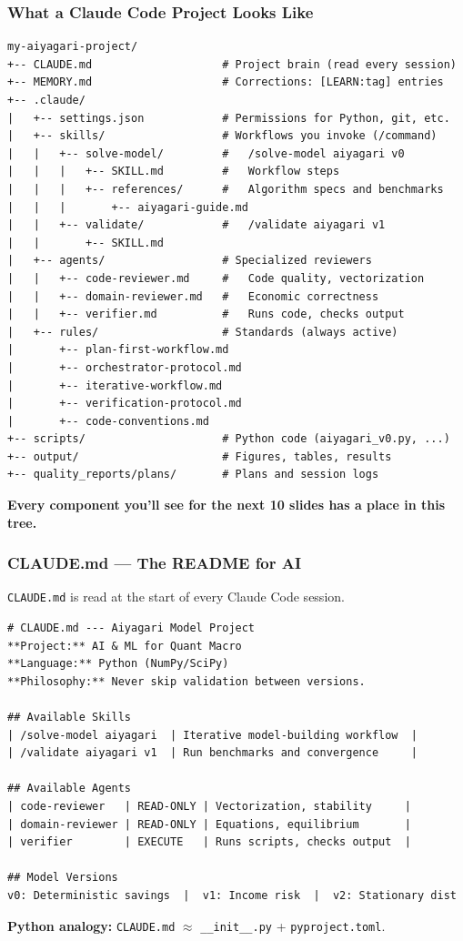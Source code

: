 \documentclass[10pt,english,aspectratio=169]{beamer}
\begin{document}
\begin{frame}[fragile]
\frametitle{What a Claude Code Project Looks Like}

\begin{lstlisting}[style=pythonstyle,language={},basicstyle=\ttfamily\tiny]
my-aiyagari-project/
+-- CLAUDE.md                    # Project brain (read every session)
+-- MEMORY.md                    # Corrections: [LEARN:tag] entries
+-- .claude/
|   +-- settings.json            # Permissions for Python, git, etc.
|   +-- skills/                  # Workflows you invoke (/command)
|   |   +-- solve-model/         #   /solve-model aiyagari v0
|   |   |   +-- SKILL.md         #   Workflow steps
|   |   |   +-- references/      #   Algorithm specs and benchmarks
|   |   |       +-- aiyagari-guide.md
|   |   +-- validate/            #   /validate aiyagari v1
|   |       +-- SKILL.md
|   +-- agents/                  # Specialized reviewers
|   |   +-- code-reviewer.md     #   Code quality, vectorization
|   |   +-- domain-reviewer.md   #   Economic correctness
|   |   +-- verifier.md          #   Runs code, checks output
|   +-- rules/                   # Standards (always active)
|       +-- plan-first-workflow.md
|       +-- orchestrator-protocol.md
|       +-- iterative-workflow.md
|       +-- verification-protocol.md
|       +-- code-conventions.md
+-- scripts/                     # Python code (aiyagari_v0.py, ...)
+-- output/                      # Figures, tables, results
+-- quality_reports/plans/       # Plans and session logs
\end{lstlisting}

\textbf{Every component you'll see for the next 10 slides has a place in this tree.}
\end{frame}

\begin{frame}[fragile]
\frametitle{CLAUDE.md --- The README for AI}

\texttt{CLAUDE.md} is read at the start of every Claude Code session.

\begin{lstlisting}[style=pythonstyle,language={},basicstyle=\ttfamily\tiny]
# CLAUDE.md --- Aiyagari Model Project
**Project:** AI & ML for Quant Macro
**Language:** Python (NumPy/SciPy)
**Philosophy:** Never skip validation between versions.

## Available Skills
| /solve-model aiyagari  | Iterative model-building workflow  |
| /validate aiyagari v1  | Run benchmarks and convergence     |

## Available Agents
| code-reviewer   | READ-ONLY | Vectorization, stability     |
| domain-reviewer | READ-ONLY | Equations, equilibrium       |
| verifier        | EXECUTE   | Runs scripts, checks output  |

## Model Versions
v0: Deterministic savings  |  v1: Income risk  |  v2: Stationary dist
\end{lstlisting}

\textbf{Python analogy:} \texttt{CLAUDE.md} $\approx$ \texttt{\_\_init\_\_.py} + \texttt{pyproject.toml}.
\end{frame}
\end{document}
